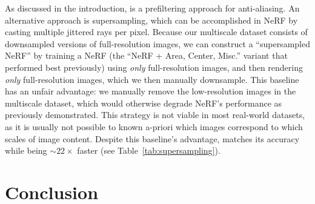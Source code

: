 \documentclass[10pt,twocolumn,letterpaper]{article}
\begin{document}
As discussed in the introduction, \shortmodelnamelower is a prefiltering approach for anti-aliasing. An alternative approach is supersampling, which can be accomplished in NeRF by casting multiple jittered rays per pixel. Because our multiscale dataset consists of downsampled versions of full-resolution images, we can construct a ``supersampled NeRF'' by training a NeRF (the ``NeRF + Area, Center, Misc.'' variant that performed best previously) using \emph{only} full-resolution images, and then rendering \emph{only} full-resolution images, which we then manually downsample. 
This baseline has an unfair advantage: we manually remove the low-resolution images in the multiscale dataset, which would otherwise degrade NeRF's performance as previously demonstrated. This strategy is not viable in most real-world datasets, as it is usually not possible to known a-priori which images correspond to which scales of image content.
Despite this baseline's advantage, \shortmodelnamelower matches its accuracy while being $\sim\!22\times$ faster (see Table~\ref{tab:supersampling}).


\begin{table}[t]
    \centering
    \vspace{-0.1in}
    \caption{
    A comparison of \shortmodelnamelower and our improved NeRF variant where both algorithms are supersampled (``SS''). \shortmodelname nearly matches the accuracy of ``SS NeRF'' while being $22\times$ faster. Adding supersampling to \shortmodelnamelower improves its accuracy slightly. We report times for rendering the test set, normalized to seconds-per-megapixel (training times are the same as Tables~\ref{tab:avg_multiblender_results} and \ref{tab:avg_blender_results}).
    }
    \label{tab:supersampling}
\end{table}


\section{Conclusion}
\end{document}
